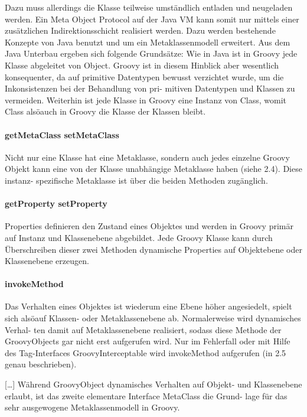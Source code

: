 \documentclass[11pt,english,ngerman, headsepline]{scrreprt}
\begin{document}
Dazu muss allerdings die Klasse teilweise umständlich entladen und neugeladen
werden. 
Ein Meta Object Protocol auf der Java VM kann
somit nur mittels einer zusätzlichen Indirektionsschicht realisiert werden.
Dazu werden bestehende Konzepte von Java benutzt und um ein Metaklassenmodell
erweitert. Aus dem Java Unterbau ergeben sich folgende Grundsätze:
Wie in Java ist in Groovy jede Klasse abgeleitet von Object. Groovy ist in
diesem Hinblick aber wesentlich konsequenter, da auf primitive Datentypen
bewusst verzichtet wurde, um die Inkonsistenzen bei der Behandlung von pri-
mitiven Datentypen und Klassen zu vermeiden. Weiterhin ist jede Klasse in Groovy
eine Instanz von Class, womit Class alsöauch in Groovy die Klasse der Klassen
bleibt.  \cite{mpInGroovy}

\paragraph{ getMetaClass setMetaClass} Nicht nur eine Klasse hat eine
Metaklasse, sondern auch jedes einzelne Groovy Objekt kann eine von der Klasse
unabhängige Metaklasse haben (siehe 2.4). Diese instanz- spezifische Metaklasse
ist über die beiden Methoden zugänglich.\\

\paragraph{ getProperty setProperty} Properties definieren den Zustand eines
Objektes und werden in Groovy primär auf Instanz und Klassenebene abgebildet. Jede Groovy
Klasse kann durch Überschreiben dieser zwei Methoden dynamische Properties auf
Objektebene oder Klassenebene erzeugen. \\

\paragraph{ invokeMethod } Das Verhalten eines Objektes ist wiederum eine Ebene
höher angesiedelt, spielt sich alsöauf Klassen- oder Metaklassenebene ab.
Normalerweise wird dynamisches Verhal- ten damit auf Metaklassenebene
realisiert, sodass diese Methode der GroovyObjects gar nicht erst aufgerufen
wird. Nur im Fehlerfall oder mit Hilfe des Tag-Interfaces GroovyInterceptable
wird invokeMethod aufgerufen (in 2.5 genau beschrieben).

[\ldots] Während GroovyObject dynamisches Verhalten auf Objekt- und
Klassenebene erlaubt, ist das zweite elementare Interface MetaClass die Grund-
lage für das sehr ausgewogene Metaklassenmodell in Groovy.
\end{document}
